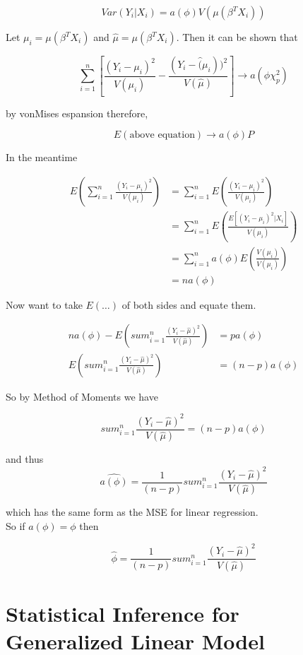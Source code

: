 \documentclass[11pt,fleqn]{book} %
\begin{document}
		$$Var(Y_i|X_i) = a(\phi)V(\mu(\beta^T X_i)) $$

Let $\mu_i = \mu(\beta^T X_i)$ and $\hat{\mu} = \mu(\beta^T X_i)$. Then it can be shown that

		$$\sum^n_{i=1} \left[\frac{(Y_i -\mu_i)^2}{V(\mu_i)} - \frac{(Y_i - \hat(\mu_i))^2}{V(\hat{\mu})} \right] \rightarrow a(\phi \chi^2_p) $$

by vonMises espansion therefore, 
	
		$$E(\text{above equation}) \rightarrow a(\phi)P $$

In the meantime
		
		\begin{align*}
			E\left(\sum^n_{i=1} \frac{(Y_i - \mu_i)^2}{V(\mu_i)} \right) &= \sum^n_{i=1} E\left( \frac{(Y_i - \mu_i)^2}{V(\mu_i)} \right)\\
					&= \sum^n_{i=1} E\left( \frac{E[(Y_i - \mu_i)^2|X_i]}{V(\mu_i)} \right)\\
					&= \sum^n_{i=1} a(\phi) E(\frac{V(\mu_i)}{V(\mu_i)})\\
					&= n a(\phi)
		\end{align*}

Now want to take $E(\dots)$ of both sides and equate them. 

		\begin{align*}
			n a(\phi) - E(sum^n_{i=1} \frac{(Y_i - \hat{\mu})^2}{V(\hat{\mu})}) &= p a(\phi)\\
			 E(sum^n_{i=1} \frac{(Y_i - \hat{\mu})^2}{V(\hat{\mu})}) &= (n-p) a(\phi)
		\end{align*}

So by Method of Moments we have

		$$ 	sum^n_{i=1} \frac{(Y_i - \hat{\mu})^2}{V(\hat{\mu})} = (n-p) a(\phi)$$

and thus 
		$$\hat{a(\phi)} = \frac{1}{(n-p)} sum^n_{i=1} \frac{(Y_i - \hat{\mu})^2}{V(\hat{\mu})} $$

which has the same form as the MSE for linear regression. \\

So if $a(\phi) = \phi$ then 

		$$\hat{\phi} =   \frac{1}{(n-p)} sum^n_{i=1} \frac{(Y_i - \hat{\mu})^2}{V(\hat{\mu})}$$


\section{Statistical Inference for Generalized Linear Model}
\end{document}
